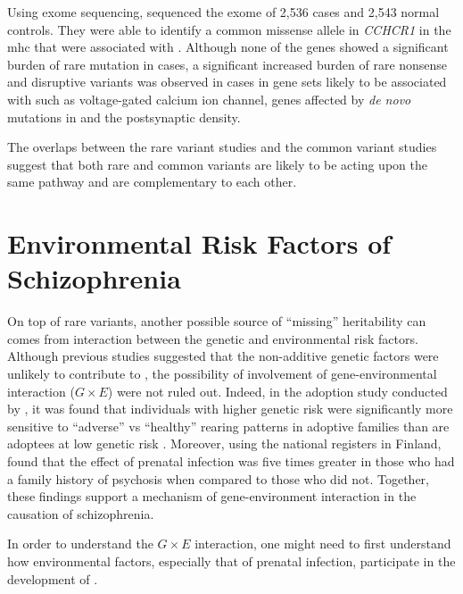 	Using exome sequencing, \citet{Purcell2014} sequenced the exome of 2,536  cases and 2,543 normal controls. 
	They were able to identify a common missense allele in \textit{CCHCR1} in the \gls{mhc} that were associated with .
	Although none of the genes showed a significant burden of rare mutation in cases, a significant increased burden of rare nonsense and disruptive variants was observed in cases in gene sets likely to be associated with  such as voltage-gated calcium ion channel, genes affected by \textit{de novo} mutations in  \citep{Fromer2014} and the postsynaptic density.

	The overlaps between the rare variant studies and the common variant studies suggest that both rare and common variants are likely to be acting upon the same pathway and are complementary to each other.
	
	\section{Environmental Risk Factors of Schizophrenia}
	On top of rare variants, another possible source of ``missing'' heritability can comes from interaction between the genetic and environmental risk factors.
	Although previous studies \citep{Gottesman01071967} suggested that the non-additive genetic factors were unlikely to contribute to , the possibility of involvement of gene-environmental interaction ($G\times E$) were not ruled out.
	Indeed, in the adoption study conducted by \citet{Tienari2004}, it was found that individuals with higher genetic risk were significantly more sensitive to ``adverse'' vs ``healthy'' rearing patterns in adoptive families than are adoptees at low genetic risk \citep{Tienari2004}.
	Moreover, using the national registers in Finland, \citet{Clarke2009} found that the effect of prenatal infection was five times greater in those who had a family history of psychosis when compared to those who did not. 
	Together, these findings support a mechanism of gene-environment interaction in the causation of schizophrenia.
	
	In order to understand the $G\times E$ interaction, one might need to first understand how environmental factors, especially that of prenatal infection, participate in the development of .
	
